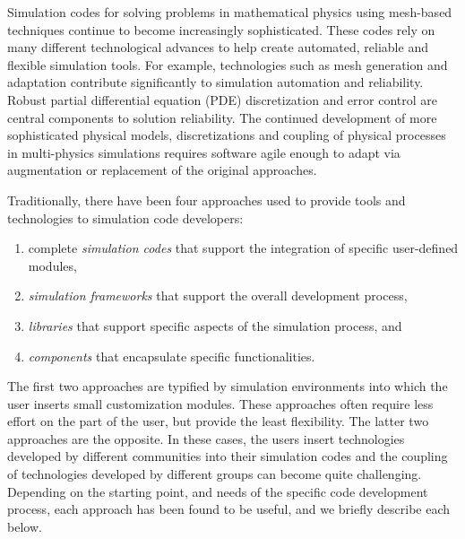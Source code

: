 Simulation codes for solving problems in mathematical physics using
mesh-based techniques continue to become increasingly sophisticated.
These codes rely on many different technological advances to help
create automated, reliable and flexible simulation tools.  For
example, technologies such as mesh generation and adaptation
contribute significantly to simulation automation and reliability.
Robust partial differential equation (PDE) discretization and error
control are central components to solution reliability.  The continued
development of more sophisticated physical models, discretizations and
coupling of physical processes in multi-physics simulations requires
software agile enough to adapt via augmentation or replacement of the
original approaches.

Traditionally, there have been four approaches used to provide
tools and technologies to simulation code developers:
\begin{enumerate}
\item complete {\it simulation codes} that support the integration of specific
      user-defined modules,
\item {\it simulation frameworks} that support the overall development process,
\item {\it libraries} that support specific aspects of the simulation
      process, and
\item {\it components} that encapsulate specific functionalities.
\end{enumerate}
The first two approaches are typified by simulation environments into
which the user inserts small customization modules.  These approaches
often require less effort on the part of the user, but provide the
least flexibility.  The latter two approaches are the opposite.  In
these cases, the users insert technologies developed by different
communities into their simulation codes and the coupling of
technologies developed by different groups can become quite
challenging.  Depending on the starting point, and needs of the
specific code development process, each approach has been found to be
useful, and we briefly describe each below.

